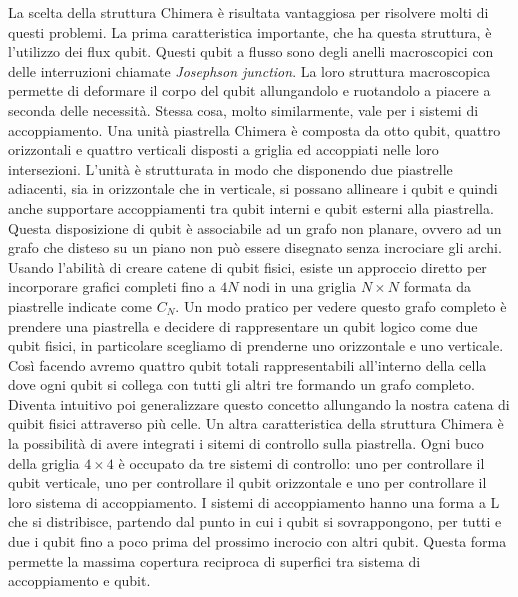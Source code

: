 La scelta della struttura Chimera è risultata vantaggiosa per risolvere molti di questi problemi. La prima caratteristica importante, che ha questa struttura, è l'utilizzo dei flux qubit. Questi qubit a flusso sono degli anelli macroscopici con delle interruzioni chiamate \textit{Josephson junction}. La loro struttura macroscopica permette di deformare il corpo del qubit allungandolo e ruotandolo a piacere a seconda delle necessità. Stessa cosa, molto similarmente, vale per i sistemi di accoppiamento. Una unità piastrella Chimera è composta da otto qubit, quattro orizzontali e quattro verticali disposti a griglia ed accoppiati nelle loro intersezioni. L'unità è strutturata in modo che disponendo due piastrelle adiacenti, sia in orizzontale che in verticale, si possano allineare i qubit e quindi anche supportare accoppiamenti tra qubit interni e qubit esterni alla piastrella. Questa disposizione di qubit è associabile ad un grafo non planare, ovvero ad un grafo che disteso su un piano non può essere disegnato senza incrociare gli archi. Usando l'abilità di creare catene di qubit fisici, esiste un approccio diretto per incorporare grafici completi fino a $4N$ nodi in una griglia $N \times N$ formata da piastrelle indicate come $C_N$. Un modo pratico per vedere questo grafo completo è prendere una piastrella e decidere di rappresentare un qubit logico come due qubit fisici, in particolare scegliamo di prenderne uno orizzontale e uno verticale. Così facendo avremo quattro qubit totali rappresentabili all'interno della cella dove ogni qubit si collega con tutti gli altri tre formando un grafo completo. Diventa intuitivo poi generalizzare questo concetto allungando la nostra catena di quibit fisici attraverso più celle. Un altra caratteristica della struttura Chimera è la possibilità di avere integrati i sitemi di controllo sulla piastrella. Ogni buco della griglia $4\times4$ è occupato da tre sistemi di controllo: uno per controllare il qubit verticale, uno per controllare il qubit orizzontale e uno per controllare il loro sistema di accoppiamento. I sistemi di accoppiamento hanno una forma a L che si distribisce, partendo dal punto in cui i qubit si sovrappongono, per tutti e due i qubit fino a poco prima del prossimo incrocio con altri qubit. Questa forma permette la massima copertura reciproca di superfici tra sistema di accoppiamento e qubit.
